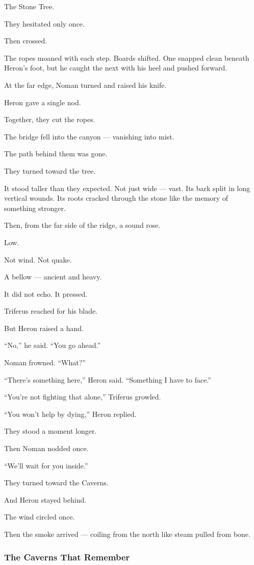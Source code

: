 \documentclass[12pt]{article}
\begin{document}
The Stone Tree.

They hesitated only once.

Then crossed.

The ropes moaned with each step. Boards shifted. One snapped clean beneath Heron’s foot, but he caught the next with his heel and pushed forward.

At the far edge, Noman turned and raised his knife.

Heron gave a single nod.

Together, they cut the ropes.

The bridge fell into the canyon — vanishing into mist.

The path behind them was gone.

\bigskip

They turned toward the tree.

It stood taller than they expected. Not just wide — vast. Its bark split in long vertical wounds. Its roots cracked through the stone like the memory of something stronger.

Then, from the far side of the ridge, a sound rose.

Low.

Not wind. Not quake.

A bellow — ancient and heavy.

It did not echo. It pressed.

Triferus reached for his blade.

But Heron raised a hand.

“No,” he said. “You go ahead.”

Noman frowned. “What?”

“There’s something here,” Heron said. “Something I have to face.”

“You’re not fighting that alone,” Triferus growled.

“You won’t help by dying,” Heron replied.

They stood a moment longer.

Then Noman nodded once.

“We’ll wait for you inside.”

They turned toward the Caverns.

And Heron stayed behind.

The wind circled once.

Then the smoke arrived — coiling from the north like steam pulled from bone.

\dotfill

\subsubsection{The Caverns That Remember}
\end{document}
